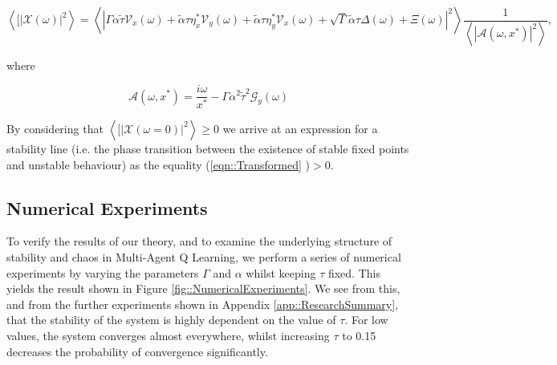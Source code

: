\documentclass[.../main.tex]{subfiles}
\begin{document}
    \begin{equation} \label{eqn::Transformed}
    \left<[|\mathcal{X}(\omega)|^2 \right> = \left< | \Gamma \alpha \tilde{\tau} \mathcal{V}_x(\omega) + \tilde{\alpha} \tau \eta^*_x \mathcal{V}_y(\omega) + \tilde{\alpha} \tau \eta^*_y \mathcal{V}_x(\omega) + \sqrt{\Gamma} \tilde{\alpha} \tau \Delta(\omega) + \Xi(\omega) |^2 \right> \frac{1}{\left< |\mathcal{A}(\omega, x^*) |^2 \right>}, 
    \end{equation}


    where

    \begin{equation}
        \mathcal{A}(\omega, x^*) = \frac{i \omega}{x^*} - \Gamma \alpha^2 \tilde{\tau}^2 \mathcal{G}_y(\omega)
    \end{equation}

    By
    considering that $\left<[|\mathcal{X}(\omega =
    0)|^2
    \right> \geq 0$  we arrive at an expression for a stability line (i.e. the phase transition
    between the
    existence of stable fixed points and unstable behaviour) as the equality (\ref{eqn::Transformed}
    )$>0$.


    \subsection{Numerical Experiments} %
    \label{sub:numerical_experiments}
    
    To verify the results of our theory, and to examine the underlying structure of stability and
    chaos in Multi-Agent Q Learning, we perform a series of numerical experiments by varying the
    parameters $\Gamma$ and $\alpha$ whilst keeping $\tau$ fixed. This yields the result shown in
    Figure \ref{fig::NumericalExperiments}. We see from this, and from the further experiments shown
    in Appendix \ref{app::ResearchSummary}, that the stability of the system is highly dependent on
    the value of $\tau$.
    For
    low values, the system converges almost everywhere, whilst increasing $\tau$ to 0.15 decreases
    the probability of convergence significantly.
\end{document}
